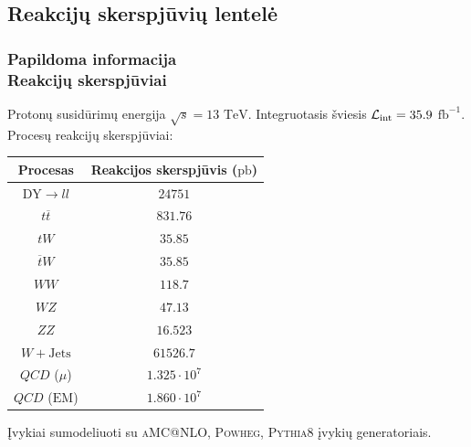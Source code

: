 \documentclass[xcolor=dvipsnames]{beamer}
\newcommand{\Lumi}{{\cal L}_\mathrm{int}}
\newcommand{\pb}{$\mathrm{pb}$}
\newcommand{\invfb}{$\mathrm{fb}^{-1}$}
\newcommand{\WJets}{\mathit{W}+\mathrm{Jets}}
\newcommand{\WW}{\mathit{WW}}
\newcommand{\ZZ}{\mathit{ZZ}}
\newcommand{\WZ}{\mathit{WZ}}
\newcommand{\QCD}{\mathit{QCD}}
\newcommand{\ttbar}{\mathit{t}\overline{\mathit{t}}}
\newcommand{\tbarW}{\overline{\mathit{t}}\mathit{W}}
\newcommand{\tW}{\mathit{tW}}
\begin{document}
\begin{frame}
	\subsection{Reakcijų skerspjūvių lentelė}
	\frametitle{Papildoma informacija\\ \small Reakcijų skerspjūviai}
	Protonų susidūrimų energija $\sqrt{\mathit{s}}=13$ $\mathrm{TeV}$.
	Integruotasis šviesis $\Lumi=35.9$ \invfb.
	Procesų reakcijų skerspjūviai:
	\begin{table}[H]
		\small
		\begin{tabular}{|c|c|}
			\hline
			Procesas & Reakcijos skerspjūvis (\pb) \\
			\hline\hline
			$\mathrm{DY}\rightarrow \mathit{ll}$ & $24751$ \\
			\hline
			$\ttbar$ & $831.76$ \\
			\hline
			$\tW$ & $35.85$ \\
			\hline
			$\tbarW$ & $35.85$ \\
			\hline
			$\WW$ & $118.7$ \\
			\hline
			$\WZ$ & $47.13$ \\
			\hline
			$\ZZ$ & $16.523$ \\
			\hline
			$\WJets$ & $61526.7$ \\
			\hline
			$\QCD$ ($\mu$) & $1.325 \cdot 10^7$ \\
			\hline
			$\QCD$ ($\mathrm{EM}$) & $1.860 \cdot 10^7$ \\
			\hline
		\end{tabular}
	\end{table}
	\vspace{-0.2cm}
	\small Įvykiai sumodeliuoti su \textsc{aMC@NLO}, \textsc{Powheg}, \textsc{Pythia8} įvykių generatoriais.
\end{frame}
\end{document}
